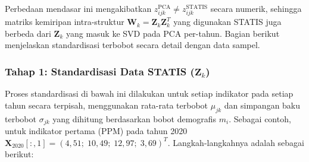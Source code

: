 Perbedaan mendasar ini mengakibatkan $z_{ijk}^{\text{PCA}} \neq z_{ijk}^{\text{STATIS}}$ secara numerik, sehingga matriks kemiripan intra-struktur $\mathbf{W}_k = \mathbf{Z}_k \mathbf{Z}_k^T$ yang digunakan STATIS juga berbeda dari $\mathbf{Z}_k$ yang masuk ke SVD pada PCA per-tahun. Bagian berikut menjelaskan standardisasi terbobot secara detail dengan data sampel.

\subsubsection{Tahap 1: Standardisasi Data STATIS (\texorpdfstring{$\mathbf{Z}_k$}{Zk})}
Proses standardisasi di bawah ini dilakukan untuk setiap indikator pada setiap tahun secara terpisah, menggunakan rata-rata terbobot $\mu_{jk}$ dan simpangan baku terbobot $\sigma_{jk}$ yang dihitung berdasarkan bobot demografis $m_i$. Sebagai contoh, untuk indikator pertama (PPM) pada tahun 2020 $\mathbf{X}_{2020}[:,1] = (4{,}51;\; 10{,}49;\; 12{,}97;\; 3{,}69)^T$. Langkah-langkahnya adalah sebagai berikut:
